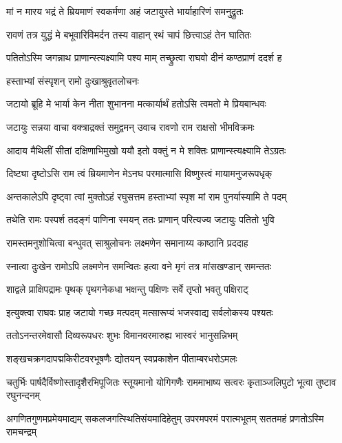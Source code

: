 \twolineshloka
{मां न मारय भद्रं ते म्रियमाणं स्वकर्मणा}
{अहं जटायुस्ते भार्याहारिणं समनुद्रुतः} %

\twolineshloka
{रावणं तत्र युद्धं मे बभूवारिविमर्दन}
{तस्य वाहान् रथं चापं छित्त्वाऽहं तेन घातितः} %

\twolineshloka
{पतितोऽस्मि जगन्नाथ प्राणान्स्त्यक्ष्यामि पश्य माम्}
{तच्छ्रुत्वा राघवो दीनं कण्ठप्राणं ददर्श ह} %

\onelineshloka
{हस्ताभ्यां संस्पृशन् रामो दुःखाश्रुवृतलोचनः} %


\twolineshloka
{जटायो ब्रूहि मे भार्या केन नीता शुभानना}
{मत्कार्यार्थं हतोऽसि त्वमतो मे प्रियबान्धवः} %

\twolineshloka
{जटायुः सन्नया वाचा वक्त्राद्रक्तं समुद्वमन्}
{उवाच रावणो राम राक्षसो भीमविक्रमः} %

\twolineshloka
{आदाय मैथिलीं सीतां दक्षिणाभिमुखो ययौ}
{इतो वक्तुं न मे शक्तिः प्राणान्स्त्यक्ष्यामि तेऽग्रतः} %

\twolineshloka
{दिष्ट्या दृष्टोऽसि राम त्वं म्रियमाणेन मेऽनघ}
{परमात्मासि विष्णुस्त्वं मायामनुजरूपधृक्} %

\twolineshloka
{अन्तकालेऽपि दृष्ट्वा त्वां मुक्तोऽहं रघुसत्तम}
{हस्ताभ्यां स्पृश मां राम पुनर्यास्यामि ते पदम्} %

\twolineshloka
{तथेति रामः पस्पर्श तदङ्गं पाणिना स्मयन्}
{ततः प्राणान् परित्यज्य जटायुः पतितो भुवि} %

\twolineshloka
{रामस्तमनुशोचित्वा बन्धुवत् साश्रुलोचनः}
{लक्ष्मणेन समानाय्य काष्ठानि प्रददाह} %

\twolineshloka
{स्नात्वा दुःखेन रामोऽपि लक्ष्मणेन समन्वितः}
{हत्वा वने मृगं तत्र मांसखण्डान् समन्ततः} %

\twolineshloka
{शाद्वले प्राक्षिपद्रामः पृथक् पृथगनेकधा}
{भक्षन्तु पक्षिणः सर्वे तृप्तो भवतु पक्षिराट्} %

\twolineshloka
{इत्युक्त्वा राघवः प्राह जटायो गच्छ मत्पदम्}
{मत्सारूप्यं भजस्वाद्य सर्वलोकस्य पश्यतः} %

\twolineshloka
{ततोऽनन्तरमेवासौ दिव्यरूपधरः शुभः}
{विमानवरमारुह्य भास्वरं भानुसन्निभम्} %

\twolineshloka
{शङ्खचक्रगदापद्मकिरीटवरभूषणैः}
{द्योतयन् स्वप्रकाशेन पीताम्बरधरोऽमलः} %

\threelineshloka
{चतुर्भिः पार्षदैर्विष्णोस्तादृशैरभिपूजितः}
{स्तूयमानो योगिगणैः राममाभाष्य सत्वरः}
{कृताञ्जलिपुटो भूत्वा तुष्टाव रघुनन्दनम्} %


\fourlineindentedshloka
{अगणितगुणमप्रमेयमाद्यम्}
{सकलजगत्स्थितिसंयमादिहेतुम्}
{उपरमपरमं परात्मभूतम्}
{सततमहं प्रणतोऽस्मि रामचन्द्रम्} %

